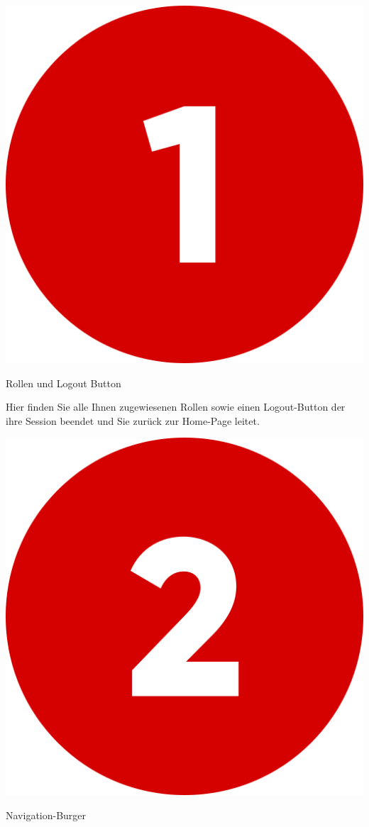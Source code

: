 \includegraphics[scale=0.05]{pics/user-guide/numbers/number-1.png} \begin{LARGE} Rollen und Logout Button \end{LARGE}

Hier finden Sie alle Ihnen zugewiesenen Rollen sowie einen Logout-Button der ihre Session beendet und Sie zurück zur Home-Page leitet.
\bigskip

\includegraphics[scale=0.05]{pics/user-guide/numbers/number-2.png} \begin{LARGE} Navigation-Burger \end{LARGE}

